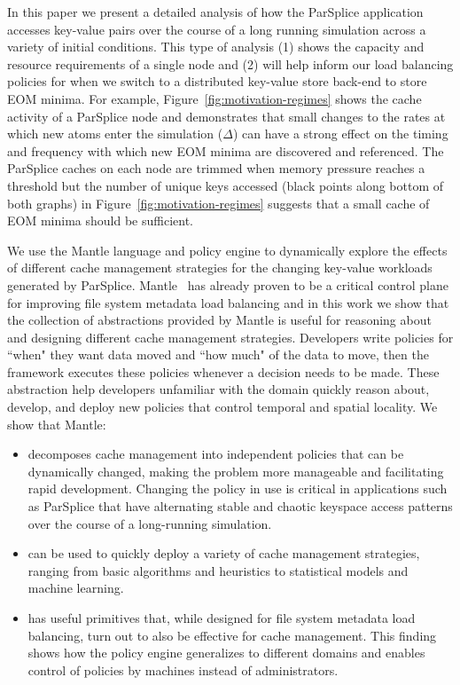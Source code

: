 In this paper we present a detailed analysis of how the ParSplice application
accesses key-value pairs over the course of a long running simulation across a
variety of initial conditions.  This type of analysis (1) shows the capacity
and resource requirements of a single node and (2) will help inform our load
balancing policies for when we switch to a distributed key-value store back-end
to store EOM minima.  For example, Figure~\ref{fig:motivation-regimes} shows
the cache activity of a ParSplice node and demonstrates that small changes to
the rates at which new atoms enter the simulation (\(\Delta\)) can have a
strong effect on the timing and frequency with which new EOM minima are
discovered and referenced.  The ParSplice caches on each node are trimmed when
memory pressure reaches a threshold but the number of unique keys accessed
(black points along bottom of both graphs) in
Figure~\ref{fig:motivation-regimes} suggests that a small cache of EOM minima
should be sufficient. 

We use the Mantle language and policy engine to dynamically explore the effects
of different cache management strategies for the changing key-value workloads
generated by ParSplice.  Mantle~\cite{sevilla:sc15-mantle} has already proven
to be a critical control plane for improving file system metadata load
balancing  and in this work we show that the collection of abstractions
provided by Mantle is useful for reasoning about and designing different cache
management strategies.  Developers write policies for ``when" they want data
moved and ``how much" of the data to move, then the framework executes these
policies whenever a decision needs to be made.  These abstraction help
developers unfamiliar with the domain quickly reason about, develop, and deploy
new policies that control temporal and spatial locality. We show that Mantle:

\begin{itemize}

  \item decomposes cache management into independent policies that can be
  dynamically changed, making the problem more manageable and facilitating rapid
  development. Changing the policy in use is critical in applications such as
  ParSplice that have alternating stable and chaotic keyspace access patterns
  over the course of a long-running simulation.  

  \item can be used to quickly deploy a variety of cache management strategies,
  ranging from basic algorithms and heuristics to statistical models and machine
  learning.

  \item has useful primitives that, while designed for file system metadata
  load balancing, turn out to also be effective for cache management. This
  finding shows how the policy engine generalizes to different domains and
  enables control of policies by machines instead of administrators.

\end{itemize}

